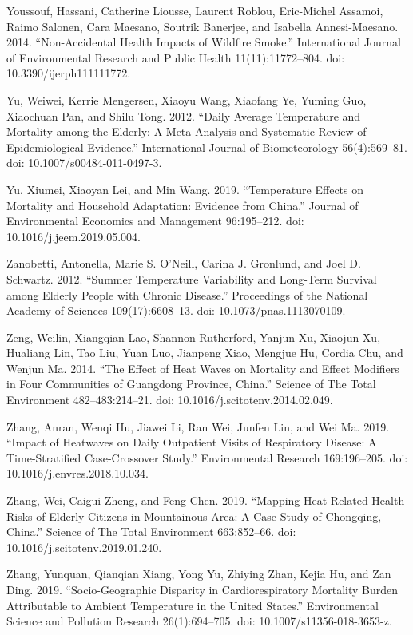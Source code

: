 \documentclass[12pt]{article}
\begin{document}
Youssouf, Hassani, Catherine Liousse, Laurent Roblou, Eric-Michel
Assamoi, Raimo Salonen, Cara Maesano, Soutrik Banerjee, and Isabella
Annesi-Maesano. 2014. ``Non-Accidental Health Impacts of Wildfire
Smoke.'' International Journal of Environmental Research and Public
Health 11(11):11772--804. doi: 10.3390/ijerph111111772.

Yu, Weiwei, Kerrie Mengersen, Xiaoyu Wang, Xiaofang Ye, Yuming Guo,
Xiaochuan Pan, and Shilu Tong. 2012. ``Daily Average Temperature and
Mortality among the Elderly: A Meta-Analysis and Systematic Review of
Epidemiological Evidence.'' International Journal of Biometeorology
56(4):569--81. doi: 10.1007/s00484-011-0497-3.

Yu, Xiumei, Xiaoyan Lei, and Min Wang. 2019. ``Temperature Effects on
Mortality and Household Adaptation: Evidence from China.'' Journal of
Environmental Economics and Management 96:195--212. doi:
10.1016/j.jeem.2019.05.004.

Zanobetti, Antonella, Marie S. O'Neill, Carina J. Gronlund, and Joel D.
Schwartz. 2012. ``Summer Temperature Variability and Long-Term Survival
among Elderly People with Chronic Disease.'' Proceedings of the National
Academy of Sciences 109(17):6608--13. doi: 10.1073/pnas.1113070109.

Zeng, Weilin, Xiangqian Lao, Shannon Rutherford, Yanjun Xu, Xiaojun Xu,
Hualiang Lin, Tao Liu, Yuan Luo, Jianpeng Xiao, Mengjue Hu, Cordia Chu,
and Wenjun Ma. 2014. ``The Effect of Heat Waves on Mortality and Effect
Modifiers in Four Communities of Guangdong Province, China.'' Science of
The Total Environment 482--483:214--21. doi:
10.1016/j.scitotenv.2014.02.049.

Zhang, Anran, Wenqi Hu, Jiawei Li, Ran Wei, Junfen Lin, and Wei Ma.
2019. ``Impact of Heatwaves on Daily Outpatient Visits of Respiratory
Disease: A Time-Stratified Case-Crossover Study.'' Environmental
Research 169:196--205. doi: 10.1016/j.envres.2018.10.034.

Zhang, Wei, Caigui Zheng, and Feng Chen. 2019. ``Mapping Heat-Related
Health Risks of Elderly Citizens in Mountainous Area: A Case Study of
Chongqing, China.'' Science of The Total Environment 663:852--66. doi:
10.1016/j.scitotenv.2019.01.240.

Zhang, Yunquan, Qianqian Xiang, Yong Yu, Zhiying Zhan, Kejia Hu, and Zan
Ding. 2019. ``Socio-Geographic Disparity in Cardiorespiratory Mortality
Burden Attributable to Ambient Temperature in the United States.''
Environmental Science and Pollution Research 26(1):694--705. doi:
10.1007/s11356-018-3653-z.
\end{document}
